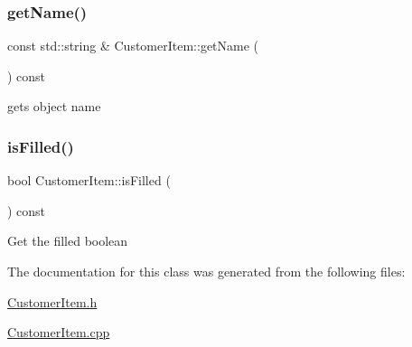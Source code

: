 \subsubsection{\texorpdfstring{get\+Name()}{getName()}}
{\footnotesize\ttfamily const std\+::string \& Customer\+Item\+::get\+Name (\begin{DoxyParamCaption}{ }\end{DoxyParamCaption}) const}

gets object name \mbox{\label{class_customer_item_a39f6b78f595b7d4a20f1e7f945834335}} 
\subsubsection{\texorpdfstring{is\+Filled()}{isFilled()}}
{\footnotesize\ttfamily bool Customer\+Item\+::is\+Filled (\begin{DoxyParamCaption}{ }\end{DoxyParamCaption}) const}

Get the filled boolean 

The documentation for this class was generated from the following files\+:\begin{DoxyCompactItemize}
\item 
\mbox{\hyperlink{_customer_item_8h}{Customer\+Item.\+h}}\item 
\mbox{\hyperlink{_customer_item_8cpp}{Customer\+Item.\+cpp}}\end{DoxyCompactItemize}
